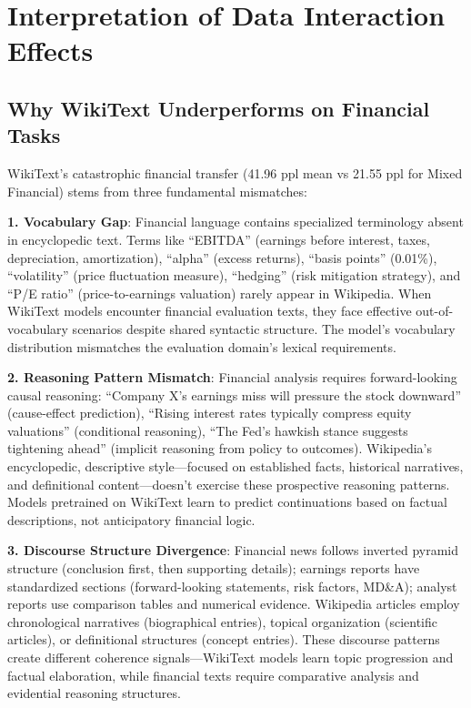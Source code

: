 \section{Interpretation of Data Interaction Effects}

\subsection{Why WikiText Underperforms on Financial Tasks}

WikiText's catastrophic financial transfer (41.96 ppl mean vs 21.55 ppl for Mixed Financial) stems from three fundamental mismatches:

\textbf{1. Vocabulary Gap}: Financial language contains specialized terminology absent in encyclopedic text. Terms like ``EBITDA'' (earnings before interest, taxes, depreciation, amortization), ``alpha'' (excess returns), ``basis points'' (0.01\%), ``volatility'' (price fluctuation measure), ``hedging'' (risk mitigation strategy), and ``P/E ratio'' (price-to-earnings valuation) rarely appear in Wikipedia. When WikiText models encounter financial evaluation texts, they face effective out-of-vocabulary scenarios despite shared syntactic structure. The model's vocabulary distribution mismatches the evaluation domain's lexical requirements.

\textbf{2. Reasoning Pattern Mismatch}: Financial analysis requires forward-looking causal reasoning: ``Company X's earnings miss will pressure the stock downward'' (cause-effect prediction), ``Rising interest rates typically compress equity valuations'' (conditional reasoning), ``The Fed's hawkish stance suggests tightening ahead'' (implicit reasoning from policy to outcomes). Wikipedia's encyclopedic, descriptive style—focused on established facts, historical narratives, and definitional content—doesn't exercise these prospective reasoning patterns. Models pretrained on WikiText learn to predict continuations based on factual descriptions, not anticipatory financial logic.

\textbf{3. Discourse Structure Divergence}: Financial news follows inverted pyramid structure (conclusion first, then supporting details); earnings reports have standardized sections (forward-looking statements, risk factors, MD\&A); analyst reports use comparison tables and numerical evidence. Wikipedia articles employ chronological narratives (biographical entries), topical organization (scientific articles), or definitional structures (concept entries). These discourse patterns create different coherence signals—WikiText models learn topic progression and factual elaboration, while financial texts require comparative analysis and evidential reasoning structures.

